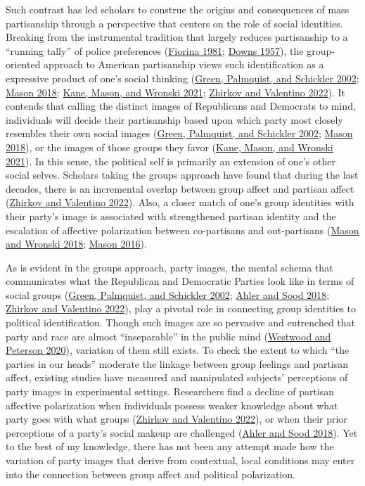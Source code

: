 \documentclass[
  12pt,
]{article}
\begin{document}
Such contrast has led scholars to construe the origins and consequences
of mass partisanship through a perspective that centers on the role of
social identities. Breaking from the instrumental tradition that largely
reduces partisanship to a ``running tally'' of police preferences
(\protect\hyperlink{ref-fiorina1981}{Fiorina 1981};
\protect\hyperlink{ref-downs1957}{Downs 1957}), the group-oriented
approach to American partisanship views such identification as a
expressive product of one's social thinking
(\protect\hyperlink{ref-green2002}{Green, Palmquist, and Schickler
2002}; \protect\hyperlink{ref-mason2018}{Mason 2018};
\protect\hyperlink{ref-kane2021}{Kane, Mason, and Wronski 2021};
\protect\hyperlink{ref-zhirkov2022}{Zhirkov and Valentino 2022}). It
contends that calling the distinct images of Republicans and Democrats
to mind, individuals will decide their partisanship based upon which
party most closely resembles their own social images
(\protect\hyperlink{ref-green2002}{Green, Palmquist, and Schickler
2002}; \protect\hyperlink{ref-mason2018}{Mason 2018}), or the images of
those groups they favor (\protect\hyperlink{ref-kane2021}{Kane, Mason,
and Wronski 2021}). In this sense, the political self is primarily an
extension of one's other social selves. Scholars taking the groups
approach have found that during the last decades, there is an
incremental overlap between group affect and partisan affect
(\protect\hyperlink{ref-zhirkov2022}{Zhirkov and Valentino 2022}). Also,
a closer match of one's group identities with their party's image is
associated with strengthened partisan identity and the escalation of
affective polarization between co-partisans and out-partisans
(\protect\hyperlink{ref-mason2018a}{Mason and Wronski 2018};
\protect\hyperlink{ref-mason2016}{Mason 2016}).

As is evident in the groups approach, party images, the mental schema
that communicates what the Republican and Democratic Parties look like
in terms of social groups (\protect\hyperlink{ref-green2002}{Green,
Palmquist, and Schickler 2002}; \protect\hyperlink{ref-ahler2018}{Ahler
and Sood 2018}; \protect\hyperlink{ref-zhirkov2022}{Zhirkov and
Valentino 2022}), play a pivotal role in connecting group identities to
political identification. Though such images are so pervasive and
entrenched that party and race are almost ``inseparable'' in the public
mind (\protect\hyperlink{ref-westwood2020}{Westwood and Peterson 2020}),
variation of them still exists. To check the extent to which ``the
parties in our heads'' moderate the linkage between group feelings and
partisan affect, existing studies have measured and manipulated
subjects' perceptions of party images in experimental settings.
Researchers find a decline of partisan affective polarization when
individuals possess weaker knowledge about what party goes with what
groups (\protect\hyperlink{ref-zhirkov2022}{Zhirkov and Valentino
2022}), or when their prior perceptions of a party's social makeup are
challenged (\protect\hyperlink{ref-ahler2018}{Ahler and Sood 2018}). Yet
to the best of my knowledge, there has not been any attempt made how the
variation of party images that derive from contextual, local conditions
may enter into the connection between group affect and political
polarization.
\end{document}
